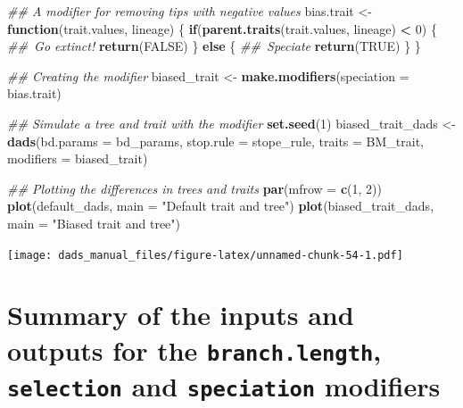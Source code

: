 \documentclass[]{book}
\newenvironment{Shaded}{\begin{snugshade}}{\end{snugshade}}
\newcommand{\CommentTok}[1]{\textcolor[rgb]{0.56,0.35,0.01}{\textit{#1}}}
\newcommand{\ControlFlowTok}[1]{\textcolor[rgb]{0.13,0.29,0.53}{\textbf{#1}}}
\newcommand{\DataTypeTok}[1]{\textcolor[rgb]{0.13,0.29,0.53}{#1}}
\newcommand{\DecValTok}[1]{\textcolor[rgb]{0.00,0.00,0.81}{#1}}
\newcommand{\KeywordTok}[1]{\textcolor[rgb]{0.13,0.29,0.53}{\textbf{#1}}}
\newcommand{\NormalTok}[1]{#1}
\newcommand{\OperatorTok}[1]{\textcolor[rgb]{0.81,0.36,0.00}{\textbf{#1}}}
\newcommand{\OtherTok}[1]{\textcolor[rgb]{0.56,0.35,0.01}{#1}}
\newcommand{\StringTok}[1]{\textcolor[rgb]{0.31,0.60,0.02}{#1}}
\begin{document}
\begin{Shaded}
\begin{Highlighting}[]
\CommentTok{## A modifier for removing tips with negative values}
\NormalTok{bias.trait <-}\StringTok{ }\ControlFlowTok{function}\NormalTok{(trait.values, lineage) \{}
    \ControlFlowTok{if}\NormalTok{(}\KeywordTok{parent.traits}\NormalTok{(trait.values, lineage) }\OperatorTok{<}\StringTok{ }\DecValTok{0}\NormalTok{) \{}
        \CommentTok{## Go extinct!}
        \KeywordTok{return}\NormalTok{(}\OtherTok{FALSE}\NormalTok{)}
\NormalTok{    \} }\ControlFlowTok{else}\NormalTok{ \{}
        \CommentTok{## Speciate}
        \KeywordTok{return}\NormalTok{(}\OtherTok{TRUE}\NormalTok{)}
\NormalTok{    \}}
\NormalTok{\}}

\CommentTok{## Creating the modifier}
\NormalTok{biased_trait <-}\StringTok{ }\KeywordTok{make.modifiers}\NormalTok{(}\DataTypeTok{speciation =}\NormalTok{ bias.trait)}

\CommentTok{## Simulate a tree and trait with the modifier}
\KeywordTok{set.seed}\NormalTok{(}\DecValTok{1}\NormalTok{)}
\NormalTok{biased_trait_dads <-}\StringTok{ }\KeywordTok{dads}\NormalTok{(}\DataTypeTok{bd.params =}\NormalTok{ bd_params,}
                          \DataTypeTok{stop.rule =}\NormalTok{ stope_rule,}
                          \DataTypeTok{traits    =}\NormalTok{ BM_trait,}
                          \DataTypeTok{modifiers =}\NormalTok{ biased_trait)}

\CommentTok{## Plotting the differences in trees and traits}
\KeywordTok{par}\NormalTok{(}\DataTypeTok{mfrow =} \KeywordTok{c}\NormalTok{(}\DecValTok{1}\NormalTok{, }\DecValTok{2}\NormalTok{))}
\KeywordTok{plot}\NormalTok{(default_dads, }\DataTypeTok{main =} \StringTok{"Default trait and tree"}\NormalTok{)}
\KeywordTok{plot}\NormalTok{(biased_trait_dads, }\DataTypeTok{main =} \StringTok{"Biased trait and tree"}\NormalTok{)}
\end{Highlighting}
\end{Shaded}

\texttt{[image: dads\_manual\_files/figure-latex/unnamed-chunk-54-1.pdf]}

\hypertarget{summarymodifiers}{%
\section{\texorpdfstring{Summary of the inputs and outputs for the \texttt{branch.length}, \texttt{selection} and \texttt{speciation} modifiers}{Summary of the inputs and outputs for the branch.length, selection and speciation modifiers}}\label{summarymodifiers}}
\end{document}
